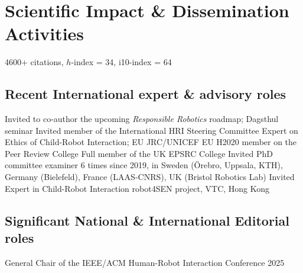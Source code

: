 \documentclass[10pt,a4paper]{moderncv}        %
\begin{document}
\section{Scientific Impact \& Dissemination Activities}

 {} {} {}
\vspace{0.2em} {4600+ citations, $h$-index = 34, i10-index = 64 } {} {} {}

\subsection{Recent International expert \& advisory roles}

 {Invited to co-author the upcoming \emph{Responsible Robotics} roadmap; Dagsthul seminar} {} {} {} {}
 {Invited member of the International HRI Steering Committee} {} {} {} {}
 {Expert on Ethics of Child-Robot Interaction; EU JRC/UNICEF} {} {} {} {}
 {EU H2020 member on the Peer Review College} {} {} {} {}
 {Full member of the UK EPSRC College} {} {} {} {}
 {Invited PhD committee examiner} {6 times since 2019, in Sweden
(Örebro, Uppsala, KTH), Germany (Bielefeld), France (LAAS-CNRS), UK (Bristol
Robotics Lab)} {} {} {}
 {Invited Expert in Child-Robot Interaction} {robot4SEN project, VTC, Hong Kong} {} {} {}

\subsection{Significant National \& International Editorial roles}

 {General Chair of the IEEE/ACM Human-Robot Interaction Conference 2025} {} {} {} {}
 {} {} {}
 {} {} {}
 {} {} {}
\end{document}
